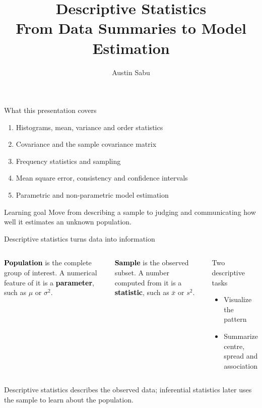 \documentclass[aspectratio=169,11pt]{beamer}
\title[]{Descriptive Statistics\\From Data Summaries to Model Estimation}
\subtitle{}
\author{Austin Sabu}
\institute{24-502-0101: Mathematics for Computing}
\date{}
\newcommand{\key}[1]{\textcolor{black}{\textbf{#1}}}
\begin{document}
\begin{frame}[plain]
\end{frame}

\begin{frame}{What this presentation covers}
\begin{enumerate}
  \item Histograms, mean, variance and order statistics
  \item Covariance and the sample covariance matrix
  \item Frequency statistics and sampling
  \item Mean square error, consistency and confidence intervals
  \item Parametric and non-parametric model estimation
\end{enumerate}
\begin{block}{Learning goal}
Move from describing a sample to judging and communicating how well it estimates an unknown population.
\end{block}
\end{frame}

\begin{frame}{Descriptive statistics turns data into information}
\begin{columns}[T]
\key{Population} is the complete group of interest. A numerical feature of it is a \key{parameter}, such as $\mu$ or $\sigma^2$.

\medskip
\key{Sample} is the observed subset. A number computed from it is a \key{statistic}, such as $\bar{x}$ or $s^2$.
\begin{block}{Two descriptive tasks}
\begin{itemize}
  \item Visualize the pattern
  \item Summarize centre, spread and association
\end{itemize}
\end{block}
\end{columns}
\medskip
Descriptive statistics describes the observed data; inferential statistics later uses the sample to learn about the population.
\end{frame}
\end{document}
